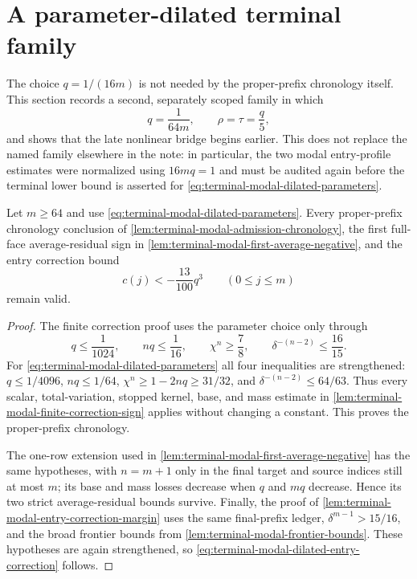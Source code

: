 \section{A parameter-dilated terminal family}
\label{sec:terminal-modal-parameter-dilation}

The choice $q=1/(16m)$ is not needed by the proper-prefix chronology itself.
This section records a second, separately scoped family in which
\begin{equation}
 q=\frac1{64m},\qquad \rho=\tau=\frac q5,
 \label{eq:terminal-modal-dilated-parameters}
\end{equation}
and shows that the late nonlinear bridge begins earlier.  This does not
replace the named family elsewhere in the note: in particular, the two modal
entry-profile estimates were normalized using $16mq=1$ and must be audited
again before the terminal lower bound is asserted for
\eqref{eq:terminal-modal-dilated-parameters}.

\begin{lemma}
\label{lem:terminal-modal-dilated-chronology}
Let $m\ge64$ and use \eqref{eq:terminal-modal-dilated-parameters}.  Every
proper-prefix chronology conclusion of
\cref{lem:terminal-modal-admission-chronology}, the first full-face
average-residual sign in
\cref{lem:terminal-modal-first-average-negative}, and the entry correction
bound
\begin{equation}
 c(j)<-\frac{13}{100}q^3\qquad(0\le j\le m)
 \label{eq:terminal-modal-dilated-entry-correction}
\end{equation}
remain valid.
\end{lemma}

\begin{proof}
The finite correction proof uses the parameter choice only through
\[
 q\le\frac1{1024},\qquad nq\le\frac1{16},\qquad
 \chi^n\ge\frac78,\qquad \delta^{-(n-2)}\le\frac{16}{15}.
\]
For \eqref{eq:terminal-modal-dilated-parameters} all four inequalities are
strengthened: $q\le1/4096$, $nq\le1/64$,
$\chi^n\ge1-2nq\ge31/32$, and
$\delta^{-(n-2)}\le64/63$.  Thus every scalar, total-variation, stopped
kernel, base, and mass estimate in
\cref{lem:terminal-modal-finite-correction-sign} applies without changing a
constant.  This proves the proper-prefix chronology.

The one-row extension used in
\cref{lem:terminal-modal-first-average-negative} has the same hypotheses,
with $n=m+1$ only in the final target and source indices still at most $m$;
its base and mass losses decrease when $q$ and $mq$ decrease.  Hence its two
strict average-residual bounds survive.  Finally, the proof of
\cref{lem:terminal-modal-entry-correction-margin} uses the same final-prefix
ledger, $\delta^{m-1}>15/16$, and the broad frontier bounds from
\cref{lem:terminal-modal-frontier-bounds}.  These hypotheses are again
strengthened, so \eqref{eq:terminal-modal-dilated-entry-correction} follows.
\end{proof}

